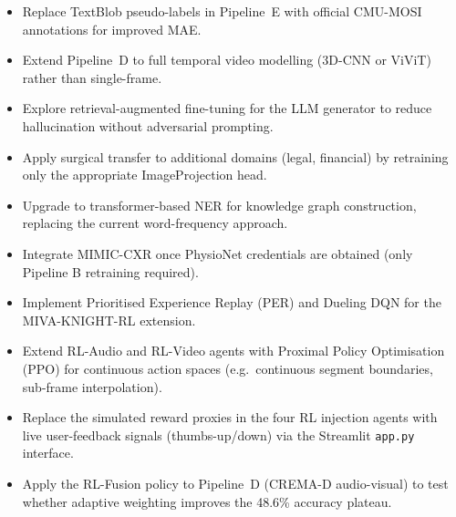 \documentclass[12pt,a4paper]{article}
\theoremstyle{definition}
\theoremstyle{plain}
\theoremstyle{remark}
\begin{document}
\vfill
\begin{center}
\begin{tcolorbox}[keybox,width=0.85\textwidth,title={Future Directions}]
\begin{itemize}[nosep]
  \item Replace TextBlob pseudo-labels in Pipeline~E with official CMU-MOSI annotations for improved MAE.
  \item Extend Pipeline~D to full temporal video modelling (3D-CNN or ViViT) rather than single-frame.
  \item Explore retrieval-augmented fine-tuning for the LLM generator to reduce hallucination without adversarial prompting.
  \item Apply surgical transfer to additional domains (legal, financial) by retraining only the appropriate ImageProjection head.
  \item Upgrade to transformer-based NER for knowledge graph construction, replacing the current word-frequency approach.
  \item Integrate MIMIC-CXR once PhysioNet credentials are obtained (only Pipeline B retraining required).
  \item Implement Prioritised Experience Replay (PER) and Dueling DQN for the MIVA-KNIGHT-RL extension.
  \item Extend RL-Audio and RL-Video agents with Proximal Policy Optimisation (PPO) for continuous action spaces (e.g.\ continuous segment boundaries, sub-frame interpolation).
  \item Replace the simulated reward proxies in the four RL injection agents with live user-feedback signals (thumbs-up/down) via the Streamlit \texttt{app.py} interface.
  \item Apply the RL-Fusion policy to Pipeline~D (CREMA-D audio-visual) to test whether adaptive weighting improves the 48.6\% accuracy plateau.
\end{itemize}
\end{tcolorbox}
\end{center}
\end{document}
